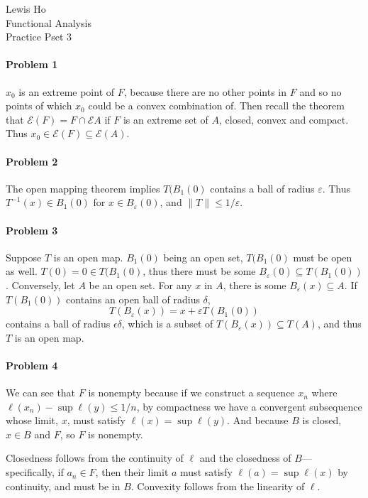 \documentclass[12pt]{article}
\begin{document}
\begin{center}
  Lewis Ho\\
  Functional Analysis\\
  Practice Pset 3
\end{center}

\paragraph{Problem 1}
$x_0$ is an extreme point of $F$, because there are no other points in $F$ and
so no points of which $x_0$ could be a convex combination of. Then recall
the theorem that $\mathcal{E}(F) = F \cap \mathcal{E}{A}$ if $F$ is an extreme
set of $A$, closed, convex and compact. Thus $x_0 \in \mathcal{E}(F) \subseteq
\mathcal{E}(A)$.

\paragraph{Problem 2}
The open mapping theorem implies $T(B_1(0)$ contains a ball of radius
$\varepsilon$. Thus $T^{-1}(x) \in B_1(0)$ for $x \in B_\varepsilon(0)$, and
$\|T\| \leq 1/\varepsilon$.

\paragraph{Problem 3}
Suppose $T$ is an open map. $B_1(0)$ being an open set, $T(B_1(0)$ must be
open as well. $T(0) = 0 \in T(B_1(0)$, thus there must be some $B_\varepsilon(0)
\subseteq T(B_1(0))$. Conversely, let $A$ be an open set. For any $x$ in $A$,
there is some $B_\varepsilon(x)\subseteq A$. If $T(B_1(0))$ contains an open ball
of radius $\delta$,
\begin{displaymath}
  T(B_\varepsilon(x)) = x + \varepsilon T(B_1(0))
\end{displaymath}
contains a ball of radius $\epsilon\delta$, which is a subset of $T(B_\varepsilon
(x))\subseteq T(A)$, and thus $T$ is an open map.

\paragraph{Problem 4}
We can see that $F$ is nonempty because if we construct a sequence $x_n$ where
$\ell(x_n) - \sup\ell(y) \leq 1/n$, by compactness we have a convergent
subsequence whose limit, $x$, must satisfy $\ell(x) = \sup\ell(y)$. And because
$B$ is closed, $x\in B$ and $F$, so $F$ is nonempty.

Closedness follows from the continuity of $\ell$ and the closedness of $B$---
specifically, if $a_n\in F$, then their limit $a$ must satisfy $\ell(a) =
\sup\ell(x)$ by continuity, and must be in $B$. Convexity follows from the
linearity of $\ell$.
\end{document}
